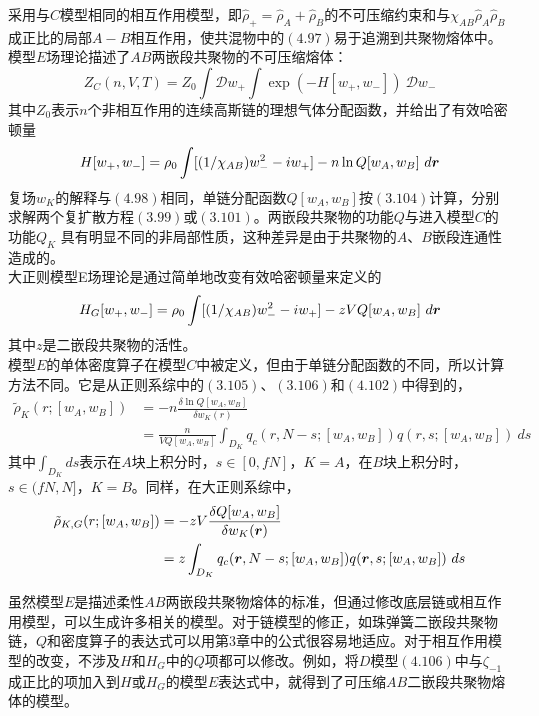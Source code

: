采用与$C$模型相同的相互作用模型，即$\hat{\rho}_{+}=\hat{\rho}_{A}+\hat{\rho}_{B}$的不可压缩约束和与$\chi_{AB} \hat{\rho}_{A} \hat{\rho}_{B}$成正比的局部$A-B$相互作用，使共混物中的$(4.97)$易于追溯到共聚物熔体中。模型$E$场理论描述了$AB$两嵌段共聚物的不可压缩熔体：\\
\begin{equation}
Z_{C}(n,V,T)=Z_{0} \int \mathcal{D} w_{+} \int  \exp (-H[w_{+},w_{-}])~\mathcal{D} w_{-}
\end{equation}
其中$Z_0$表示$n$个非相互作用的连续高斯链的理想气体分配函数，并给出了有效哈密顿量\\
\begin{equation}
H[ w_{+}, w_{-}]= \rho_{0} \int  [(1/\chi_{AB})w_{-}^{2}-i w_{+}]-n \ln Q[w_{A},w_{B}]~d \bm{r}
\end{equation}
复场$w_{K}$的解释与$(4.98)$相同，单链分配函数$Q[w_{A},w_{B}]$按$(3.104)$计算，分别求解两个复扩散方程$(3.99)$或$(3.101)$。两嵌段共聚物的功能$Q$与进入模型$C$的功能$Q_{K}$ 具有明显不同的非局部性质，这种差异是由于共聚物的$A$、$B$嵌段连通性造成的。\\

大正则模型E场理论是通过简单地改变有效哈密顿量来定义的\\
\begin{equation}
H_{G}[ w_{+}, w_{-}]= \rho_{0} \int  [(1/\chi_{AB}) w_{-}^{2}-i w_{+}]- z  V Q[w_{A},w_{B}]~d\bm{r}
\end{equation}
其中$z$是二嵌段共聚物的活性。\\

模型$E$的单体密度算子在模型$C$中被定义，但由于单链分配函数的不同，所以计算方法不同。它是从正则系综中的$(3.105)$、$(3.106)$和$(4.102)$中得到的，\\
\begin{equation}
\begin{aligned}
\tilde{\rho}_{K}(r;[w_{A},w_{B}]) &=-n \frac{\delta \ln Q[w_{A},w_{B}]}{\delta w_{K}(r)} \\&= \frac{n}{V Q[w_{A},w_{B}]} \int_{D_{K}} q_{c}(r,N-s;[w_{A},w_{B}])q(r,s;[w_{A},w_{B}])~ds
\end{aligned}
\end{equation}
其中$\int_{D_{K}} ds$表示在$A$块上积分时，$s\in[0,fN]$，$K=A$，在$B$块上积分时，$s\in(fN,N]$，$K=B$。同样，在大正则系综中，\\
\begin{equation}
\begin{aligned}
\tilde{\rho}_{K,G}(r;[w_{A},w_{B}])&=-z V \frac{\delta Q[w_{A},w_{B}]}{\delta w_{K}(\bm{r})} \\&= z \int_{D_{K}}  q_{c}(\bm{r},N-s;[w_{A},w_{B}])q(\bm{r},s;[w_{A},w_{B}])~d s
\end{aligned}
\end{equation}

虽然模型$E$是描述柔性$AB$两嵌段共聚物熔体的标准，但通过修改底层链或相互作用模型，可以生成许多相关的模型。对于链模型的修正，如珠弹簧二嵌段共聚物链，$Q$和密度算子的表达式可以用第3章中的公式很容易地适应。对于相互作用模型的改变，不涉及$H$和$H_{G}$中的$Q$项都可以修改。例如，将$D$模型$(4.106)$中与$\zeta_{-1}$成正比的项加入到$H$或$H_{G}$的模型$E$表达式中，就得到了可压缩$AB$二嵌段共聚物熔体的模型。

